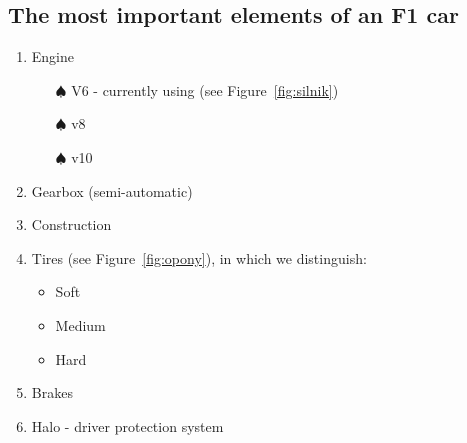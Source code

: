 \newpage
\subsection*{The most important elements of an F1 car}
\label{sub:elementy}

\begin{enumerate}
    \item Engine  
    \begin{itemize}
        \item[$\spadesuit$] V6 - currently using (see Figure~\ref{fig:silnik})
        \item[$\spadesuit$] v8 
        \item[$\spadesuit$] v10
        
    \end{itemize}
    \item Gearbox (semi-automatic)
    \item Construction
    \item Tires (see Figure~\ref{fig:opony}), in which we distinguish:\begin{itemize}
        \item Soft
        \item Medium
        \item Hard 
    \end{itemize}
    \item Brakes
    \item Halo - driver protection system
\end{enumerate}





